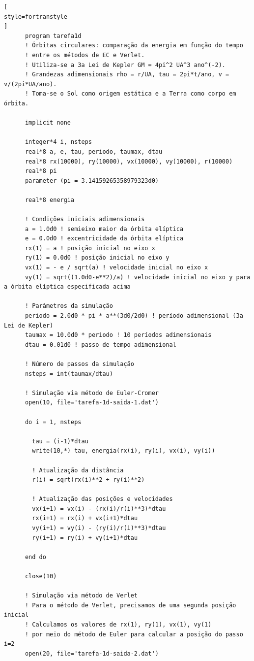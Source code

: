 \documentclass[12pt,a4paper]{article}
\begin{document}
\begin{lstlisting}[
style=fortranstyle
]
      program tarefa1d
      ! Órbitas circulares: comparação da energia em função do tempo
      ! entre os métodos de EC e Verlet.
      ! Utiliza-se a 3a Lei de Kepler GM = 4pi^2 UA^3 ano^(-2).
      ! Grandezas adimensionais rho = r/UA, tau = 2pi*t/ano, v = v/(2pi*UA/ano).
      ! Toma-se o Sol como origem estática e a Terra como corpo em órbita.

      implicit none

      integer*4 i, nsteps
      real*8 a, e, tau, periodo, taumax, dtau
      real*8 rx(10000), ry(10000), vx(10000), vy(10000), r(10000)
      real*8 pi
      parameter (pi = 3.14159265358979323d0)

      real*8 energia

      ! Condições iniciais adimensionais
      a = 1.0d0 ! semieixo maior da órbita elíptica
      e = 0.0d0 ! excentricidade da órbita elíptica
      rx(1) = a ! posição inicial no eixo x
      ry(1) = 0.0d0 ! posição inicial no eixo y
      vx(1) = - e / sqrt(a) ! velocidade inicial no eixo x
      vy(1) = sqrt((1.0d0-e**2)/a) ! velocidade inicial no eixo y para a órbita elíptica especificada acima

      ! Parâmetros da simulação
      periodo = 2.0d0 * pi * a**(3d0/2d0) ! período adimensional (3a Lei de Kepler)
      taumax = 10.0d0 * periodo ! 10 períodos adimensionais
      dtau = 0.01d0 ! passo de tempo adimensional

      ! Número de passos da simulação
      nsteps = int(taumax/dtau)

      ! Simulação via método de Euler-Cromer
      open(10, file='tarefa-1d-saida-1.dat')

      do i = 1, nsteps

        tau = (i-1)*dtau
        write(10,*) tau, energia(rx(i), ry(i), vx(i), vy(i))

        ! Atualização da distância
        r(i) = sqrt(rx(i)**2 + ry(i)**2)

        ! Atualização das posições e velocidades
        vx(i+1) = vx(i) - (rx(i)/r(i)**3)*dtau
        rx(i+1) = rx(i) + vx(i+1)*dtau
        vy(i+1) = vy(i) - (ry(i)/r(i)**3)*dtau
        ry(i+1) = ry(i) + vy(i+1)*dtau

      end do

      close(10)

      ! Simulação via método de Verlet
      ! Para o método de Verlet, precisamos de uma segunda posição inicial
      ! Calculamos os valores de rx(1), ry(1), vx(1), vy(1)
      ! por meio do método de Euler para calcular a posição do passo i=2
      open(20, file='tarefa-1d-saida-2.dat')


\end{lstlisting}
\end{document}
